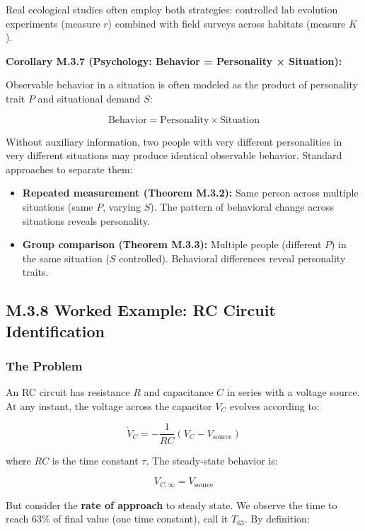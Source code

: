 \documentclass[
]{article}
\providecommand{\tightlist}{%
  \setlength{\itemsep}{0pt}\setlength{\parskip}{0pt}}
\begin{document}
Real ecological studies often employ both strategies: controlled lab
evolution experiments (measure \(r\)) combined with field surveys across
habitats (measure \(K\)).

\textbf{Corollary M.3.7 (Psychology: Behavior = Personality ×
Situation):}

Observable behavior in a situation is often modeled as the product of
personality trait \(P\) and situational demand \(S\):

\[\text{Behavior} = \text{Personality} \times \text{Situation}\]

Without auxiliary information, two people with very different
personalities in very different situations may produce identical
observable behavior. Standard approaches to separate them:

\begin{itemize}
\tightlist
\item
  \textbf{Repeated measurement (Theorem M.3.2):} Same person across
  multiple situations (same \(P\), varying \(S\)). The pattern of
  behavioral change across situations reveals personality.
\item
  \textbf{Group comparison (Theorem M.3.3):} Multiple people (different
  \(P\)) in the same situation (\(S\) controlled). Behavioral
  differences reveal personality traits.
\end{itemize}

\subsection{M.3.8 Worked Example: RC Circuit
Identification}\label{m.3.8-worked-example-rc-circuit-identification}

\subsubsection{The Problem}\label{the-problem-4}

An RC circuit has resistance \(R\) and capacitance \(C\) in series with
a voltage source. At any instant, the voltage across the capacitor
\(V_C\) evolves according to:

\[\dot{V}_C = -\frac{1}{RC}(V_C - V_{\text{source}})\]

where \(RC\) is the time constant \(\tau\). The steady-state behavior
is:

\[V_{C,\infty} = V_{\text{source}}\]

But consider the \textbf{rate of approach} to steady state. We observe
the time to reach 63\% of final value (one time constant), call it
\(T_{63}\). By definition:
\end{document}

